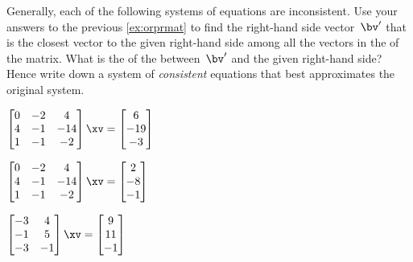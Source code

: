 \begin{exercise} \label{ex:aicebcb} 
Generally, each of the following systems of equations are inconsistent.
Use your answers to the previous \autoref{ex:orprmat} to find the right-hand side vector~\(\bv'\) that is the closest vector to the given right-hand side among all the vectors in the  of the matrix.  
What is the  of the  between~\(\bv'\) and the given right-hand side?
Hence write down a system of \emph{consistent} equations that best approximates the original system.
\begin{Parts}
\item \(\begin{bmatrix} 0&-2&4
\\4&-1&-14
\\1&-1&-2 \end{bmatrix}\xv
=\begin{bmatrix} 6\\-19\\-3 \end{bmatrix}\)

\item \(\begin{bmatrix} 0&-2&4
\\4&-1&-14
\\1&-1&-2 \end{bmatrix}\xv
=\begin{bmatrix} 2\\-8\\-1 \end{bmatrix}\)

\item \(\begin{bmatrix} -3&4
\\-1&5
\\-3&-1 \end{bmatrix}\xv
=\begin{bmatrix} 9\\11\\-1 \end{bmatrix}\)


\end{Parts}
\end{exercise}
